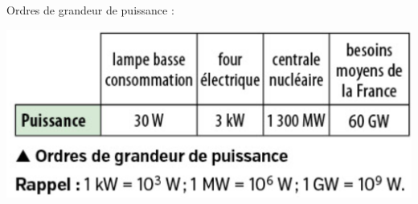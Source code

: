 \documentclass[12pt,a4paper]{article}
\begin{document}
\begin{myex}
	Ordres de grandeur de puissance :
	\begin{center}
		\includegraphics[scale=0.4]{ordre}
	\end{center}
\end{myex}
\end{document}
